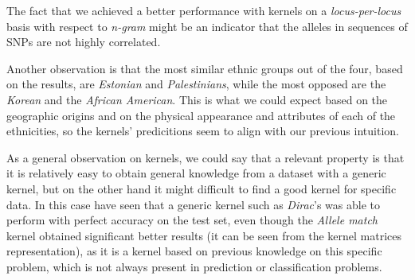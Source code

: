 \documentclass[a4paper, 11pt]{article}
\theoremstyle{definition}
\theoremstyle{remark}
\begin{document}
The fact that we achieved a better performance with kernels on a \textit{locus-per-locus} basis with respect to \textit{n-gram} might be an indicator that the alleles in sequences of SNPs are not highly correlated.\par
Another observation is that the most similar ethnic groups out of the four, based on the results, are \textit{Estonian} and \textit{Palestinians}, while the most opposed are the \textit{Korean} and the \textit{African American}. This is what we could expect based on the geographic origins and on the physical appearance and attributes of each of the ethnicities, so the kernels' predicitions seem to align with our previous intuition.\par
As a general observation on kernels, we could say that a relevant property is that it is relatively easy to obtain general knowledge from a dataset with a generic kernel, but on the other hand it might difficult to find a good kernel for specific data. In this case have seen that a generic kernel such as \textit{Dirac}'s was able to perform with perfect accuracy on the test set, even though the \textit{Allele match} kernel obtained significant better results (it can be seen from the kernel matrices representation), as it is a kernel based on previous knowledge on this specific problem, which is not always present in prediction or classification problems.


\newpage

\printbibliography[
heading=bibintoc,
title={References}
]
\end{document}
